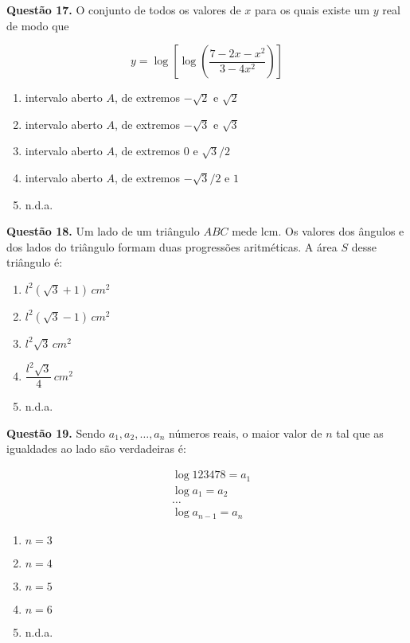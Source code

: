 \documentclass[11pt]{article}
\begin{document}
\textbf{Questão 17.} O  conjunto  de  todos  os  valores  de  $x$  para  os  quais  existe um $y$ real de modo que

$$
y = \log \left[ \log \left( \frac{7 - 2x - x^2}{3 - 4x^2} \right) \right]
$$

\begin{enumerate}[\bf A (\quad)]
    \item intervalo aberto $A$, de extremos $-\sqrt{2}$ e $\sqrt{2}$
    \item intervalo aberto $A$, de extremos $-\sqrt{3}$ e $\sqrt{3}$
    \item intervalo aberto $A$, de extremos $0$ e $\sqrt{3}/2$
    \item intervalo aberto $A$, de extremos $-\sqrt{3}/2$ e $1$
    \item n.d.a.
\end{enumerate}

\textbf{Questão 18.} Um  lado  de  um  triângulo  $ABC$  mede  lcm.  Os  valores dos ângulos e dos lados do triângulo formam duas progressões aritméticas. A área $S$ desse triângulo é:


\begin{enumerate}[\bf A (\quad)]
    \item $l^2(\sqrt{3} + 1) \, cm^2$
    \item $l^2(\sqrt{3} - 1) \, cm^2$
    \item $l^2\sqrt{3} \, cm^2$
    \item $\dfrac{l^2\sqrt{3}}{4} \, cm^2$
    \item n.d.a.
\end{enumerate}

\textbf{Questão 19.} Sendo $a_1,  a_2, \dots, a_n$ números reais, o maior valor de $n$ tal que as igualdades ao lado são verdadeiras é:

\begin{align*}
&\log 123478 = a_1 \\
&\log a_1 = a_2 \\
&\dots \\
&\log a_{n-1} = a_n
\end{align*}

\begin{multicols}{5}
    \begin{enumerate}[\bf A (\quad)]
        \item $n = 3$
        \item $n = 4$
        \item $n = 5$
        \item $n = 6$
        \item n.d.a.
    \end{enumerate}
\end{multicols}
\end{document}
